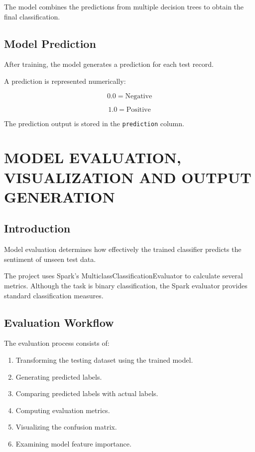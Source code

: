 \documentclass[12pt,a4paper]{article}
\begin{document}
The model combines the predictions from multiple decision trees to obtain the final classification.

\subsection{Model Prediction}

After training, the model generates a prediction for each test record.

A prediction is represented numerically:

\[
0.0 = \text{Negative}
\]

\[
1.0 = \text{Positive}
\]

The prediction output is stored in the \texttt{prediction} column.


\newpage
\section{MODEL EVALUATION, VISUALIZATION AND OUTPUT GENERATION}

\subsection{Introduction}

Model evaluation determines how effectively the trained classifier predicts the sentiment of unseen test data.

The project uses Spark's MulticlassClassificationEvaluator to calculate several metrics. Although the task is binary classification, the Spark evaluator provides standard classification measures.

\subsection{Evaluation Workflow}

The evaluation process consists of:

\begin{enumerate}
    \item Transforming the testing dataset using the trained model.
    \item Generating predicted labels.
    \item Comparing predicted labels with actual labels.
    \item Computing evaluation metrics.
    \item Visualizing the confusion matrix.
    \item Examining model feature importance.
\end{enumerate}
\end{document}
